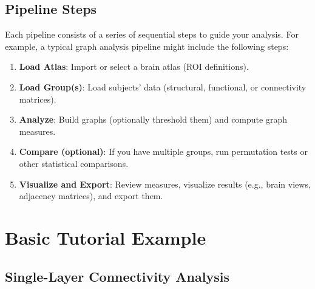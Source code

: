 \documentclass[justified]{tufte-handout}
\begin{document}
\subsection{Pipeline Steps}

Each pipeline consists of a series of sequential steps to guide your analysis. For example, a typical graph analysis pipeline might include the following steps:
\begin{enumerate}

\item \textbf{Load Atlas}: Import or select a brain atlas (ROI definitions).

\item \textbf{Load Group(s)}: Load subjects' data (structural, functional, or connectivity matrices).

\item \textbf{Analyze}: Build graphs (optionally threshold them) and compute graph measures.

\item \textbf{Compare (optional)}: If you have multiple groups, run permutation tests or other statistical comparisons.

\item \textbf{Visualize and Export}: Review measures, visualize results (e.g., brain views, adjacency matrices), and export them.

\end{enumerate}

\section{Basic Tutorial Example}

\subsection{Single-Layer Connectivity Analysis}
\end{document}
